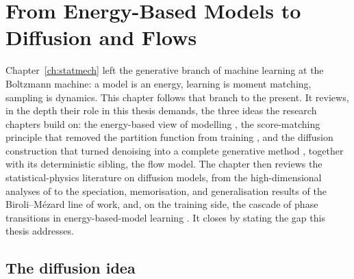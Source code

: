 \chapter{From Energy-Based Models to Diffusion and Flows}
\label{ch:diffusion-long}\label{ch:ebm}

Chapter~\ref{ch:statmech} left the generative branch of machine learning
at the Boltzmann machine: a model is an energy, learning is moment
matching, sampling is dynamics. This chapter follows that branch to the
present. It reviews, in the depth their role in this thesis demands, the
three ideas the research chapters build on: the energy-based view of
modelling \citep{lecun2006tutorial}, the score-matching principle that
removed the partition function from training
\citep{hyvarinen2005estimation, vincent2011connection}, and the diffusion
construction that turned denoising into a complete generative method
\citep{sohl2015deep, ho2020denoising, song2021scorebased}, together with
its deterministic sibling, the flow model. The chapter then reviews the
statistical-physics literature on diffusion models, from the
high-dimensional analyses of \citet{biroli2023generative} to the
speciation, memorisation, and generalisation results of the
Biroli--M\'ezard line of work, and, on the training side, the cascade of
phase transitions in energy-based-model learning
\citep{bachtis2024cascade}. It closes by stating the gap this thesis
addresses.

\section{The diffusion idea}\label{sec:diffusion-idea}


